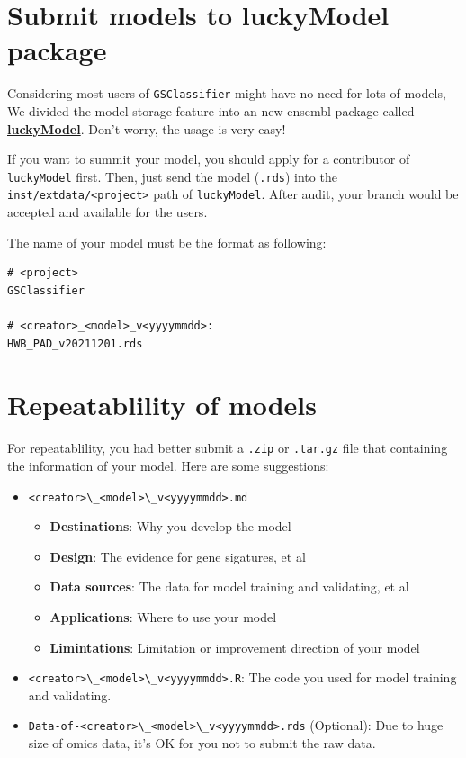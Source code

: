 \documentclass[
  12pt,
]{book}
\newcommand{\passthrough}[1]{#1}
\begin{document}
\hypertarget{submit-models-to-luckymodel-package}{%
\section{Submit models to luckyModel package}\label{submit-models-to-luckymodel-package}}

Considering most users of \passthrough{\lstinline!GSClassifier!} might have no need for lots of models, We divided the model storage feature into an new ensembl package called \href{https://github.com/huangwb8/luckyModel}{\textbf{luckyModel}}. Don't worry, the usage is very easy!

If you want to summit your model, you should apply for a contributor of \passthrough{\lstinline!luckyModel!} first. Then, just send the model (\passthrough{\lstinline!.rds!}) into the \passthrough{\lstinline!inst/extdata/<project>!} path of \passthrough{\lstinline!luckyModel!}. After audit, your branch would be accepted and available for the users.

The name of your model must be the format as following:

\begin{lstlisting}
# <project>
GSClassifier

# <creator>_<model>_v<yyyymmdd>:
HWB_PAD_v20211201.rds
\end{lstlisting}

\hypertarget{repeatablility-of-models}{%
\section{Repeatablility of models}\label{repeatablility-of-models}}

For repeatablility, you had better submit a \passthrough{\lstinline!.zip!} or \passthrough{\lstinline!.tar.gz!} file that containing the information of your model. Here are some suggestions:

\begin{itemize}
\item
  \passthrough{\lstinline!<creator>\_<model>\_v<yyyymmdd>.md!}

  \begin{itemize}
  \item
    \textbf{Destinations}: Why you develop the model
  \item
    \textbf{Design}: The evidence for gene sigatures, et al
  \item
    \textbf{Data sources}: The data for model training and validating, et al
  \item
    \textbf{Applications}: Where to use your model
  \item
    \textbf{Limintations}: Limitation or improvement direction of your model
  \end{itemize}
\item
  \passthrough{\lstinline!<creator>\_<model>\_v<yyyymmdd>.R!}: The code you used for model training and validating.
\item
  \passthrough{\lstinline!Data-of-<creator>\_<model>\_v<yyyymmdd>.rds!} (Optional): Due to huge size of omics data, it's OK for you not to submit the raw data.
\end{itemize}
\end{document}
